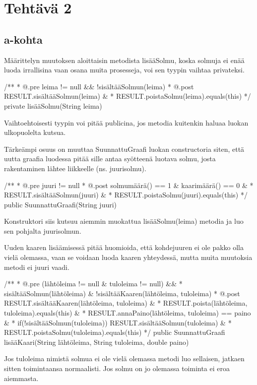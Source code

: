 
\chapter{Tehtävä 2 \label{chap:Teht=0000E4v=0000E4-2}}

\section{a-kohta}
\label{a-kohta}
Määrittelyn muutoksen aloittaisin metodista lisääSolmu, koska solmuja ei enää
luoda irrallisina vaan osana muita prosesseja, voi sen tyypin vaihtaa privateksi.
\begin{javacode}
/**
* @.pre leima != null && !sisältääSolmun(leima)
* @.post RESULT.sisältääSolmun(leima) &
* RESULT.poistaSolmu(leima).equals(this)
*/
private lisääSolmu(String leima)
\end{javacode}
Vaihtoehtoisesti tyypin voi pitää publicina, jos metodia kuitenkin haluaa luokan
ulkopuolelta kutsua.

Tärkeämpi osuus on muuttaa SuunnattuGraafi luokan constructoria siten, että
uutta graafia luodessa pitää sille antaa syötteenä luotava solmu, josta
rakentaminen lähtee liikkeelle (ns. juurisolmu).

\begin{javacode}
/**
* @.pre juuri != null
* @.post solmumäärä() == 1 & kaarimäärä() == 0 &
*        RESULT.sisältääSolmun(juuri) &
*        RESULT.poistaSolmu(juuri).equals(this)
*/
public SuunnattuGraafi(String juuri)
\end{javacode}
Konstruktori siis kutsuu aiemmin muokattua lisääSolmu(leima) metodia ja luo
sen pohjalta juurisolmun.

Uuden kaaren lisäämisessä pitää huomioida, että kohdejuuren ei ole pakko olla vielä
olemassa, vaan se voidaan luoda kaaren yhteydessä, mutta muita muutoksia metodi ei
juuri vaadi.
\begin{javacode}
/**
* @.pre (lähtöleima != null & tuloleima != null) &&
* sisältääSolmun(lähtöleima) & !sisältääKaaren(lähtöleima, tuloleima)
* @.post RESULT.sisältääKaaren(lähtöleima, tuloleima) &
* RESULT.poista(lähtöleima, tuloleima).equals(this) &
* RESULT.annaPaino(lähtöleima, tuloleima) == paino &
* if(!sisältääSolmun(tuloleima))  RESULT.sisältääSolmun(tuloleima) &
*                                 RESULT.poistaSolmu(tuloleima).equals(this)
*/
public SuunnattuGraafi lisääKaari(String lähtöleima, String tuloleima,
double paino)
\end{javacode}
Jos tuloleima nimistä solmua ei ole vielä olemassa metodi luo sellaisen, jatkaen
sitten toimintaansa normaalisti. Jos solmu on jo olemassa toiminta ei eroa aiemmasta.


